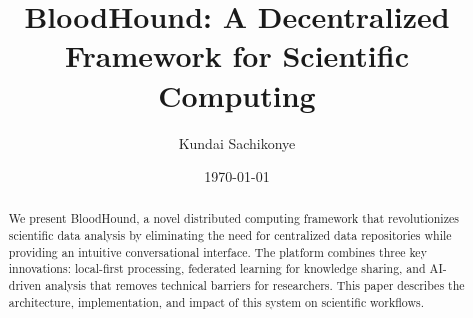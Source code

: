 \documentclass[11pt,a4paper]{article}
\title{BloodHound: A Decentralized Framework for Scientific Computing}
\author{Kundai Sachikonye}
\date{\today}
\begin{document}
\maketitle

\begin{abstract}
We present BloodHound, a novel distributed computing framework that revolutionizes scientific data analysis by eliminating the need for centralized data repositories while providing an intuitive conversational interface. The platform combines three key innovations: local-first processing, federated learning for knowledge sharing, and AI-driven analysis that removes technical barriers for researchers. This paper describes the architecture, implementation, and impact of this system on scientific workflows.
\end{abstract}
\end{document}
